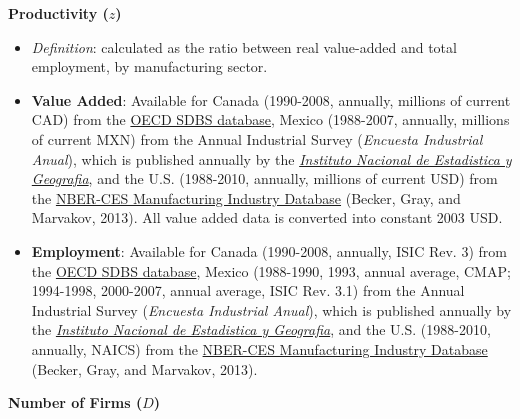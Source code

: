 \begin{spacing}{1}

\noindent \textbf{Productivity ($z$)}
	\begin{itemize}
	
	\item \emph{Definition}: calculated as the ratio between real value-added and total employment, by manufacturing sector.
	
	\item \textbf{Value Added}:  Available for Canada (1990-2008, annually, millions of current CAD) from  the \href{http://stats.oecd.org/index.aspx?queryid=224}{OECD SDBS database}, Mexico (1988-2007, annually, millions of current MXN) from the Annual Industrial Survey (\emph{Encuesta Industrial Anual}), which is published annually by   the \href{http://buscador.inegi.org.mx/search?q=encuesta+industrial+anual&client=ProductosR&proxystylesheet=ProductosR&num=10&getfields=*&sort=meta:edicion:D:E:::D&entsp=a__inegi_politica_p72&lr=lang_es\%7Clang_en&oe=UTF-8&ie=UTF-8&ip=10.210.100.253&entqr=3&filter=0&site=ProductosBuscador&tlen=260&ulang=en&start=0}{\emph{Instituto Nacional de Estadistica y Geografia}}, and the U.S. (1988-2010, annually, millions of current USD) from  the \href{http://www.nber.org/nberces/}{NBER-CES Manufacturing Industry Database} (Becker, Gray, and Marvakov, 2013). All value added data is converted into constant 2003 USD.		
	
	\item \textbf{Employment}: Available for Canada (1990-2008, annually, ISIC Rev. 3) from the \href{http://stats.oecd.org/index.aspx?queryid=224}{OECD SDBS database},  Mexico (1988-1990, 1993, annual average, CMAP; 1994-1998, 2000-2007, annual average, ISIC Rev. 3.1) from the Annual Industrial Survey (\emph{Encuesta Industrial Anual}), which is published annually by   the \href{http://buscador.inegi.org.mx/search?q=encuesta+industrial+anual&client=ProductosR&proxystylesheet=ProductosR&num=10&getfields=*&sort=meta:edicion:D:E:::D&entsp=a__inegi_politica_p72&lr=lang_es\%7Clang_en&oe=UTF-8&ie=UTF-8&ip=10.210.100.253&entqr=3&filter=0&site=ProductosBuscador&tlen=260&ulang=en&start=0}{\emph{Instituto Nacional de Estadistica y Geografia}}, and the U.S. (1988-2010, annually, NAICS) from the \href{http://www.nber.org/nberces/}{NBER-CES Manufacturing Industry Database} (Becker, Gray, and Marvakov, 2013).  	
	\end{itemize}
	
\noindent \textbf{Number of Firms ($D$)}
	\begin{itemize}
	

\end{itemize}
\end{spacing}
